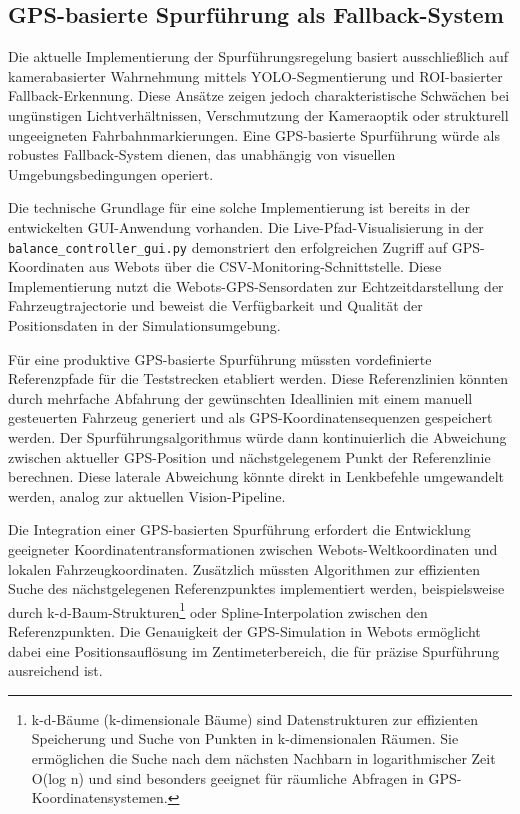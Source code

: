 \subsection{GPS-basierte Spurführung als Fallback-System}

Die aktuelle Implementierung der Spurführungsregelung basiert ausschließlich auf kamerabasierter Wahrnehmung mittels YOLO-Segmentierung 
und ROI-basierter Fallback-Erkennung. Diese Ansätze zeigen jedoch charakteristische Schwächen bei ungünstigen Lichtverhältnissen, 
Verschmutzung der Kameraoptik oder strukturell ungeeigneten Fahrbahnmarkierungen. Eine GPS-basierte Spurführung würde als 
robustes Fallback-System dienen, das unabhängig von visuellen Umgebungsbedingungen operiert.

Die technische Grundlage für eine solche Implementierung ist bereits in der entwickelten GUI-Anwendung vorhanden. Die 
Live-Pfad-Visualisierung in der \texttt{balance\_controller\_gui.py} demonstriert den erfolgreichen Zugriff auf GPS-Koordinaten 
aus Webots über die CSV-Monitoring-Schnittstelle. Diese Implementierung nutzt die Webots-GPS-Sensordaten zur Echtzeitdarstellung 
der Fahrzeugtrajectorie und beweist die Verfügbarkeit und Qualität der Positionsdaten in der Simulationsumgebung.

Für eine produktive GPS-basierte Spurführung müssten vordefinierte Referenzpfade für die Teststrecken etabliert werden. Diese 
Referenzlinien könnten durch mehrfache Abfahrung der gewünschten Ideallinien mit einem manuell gesteuerten Fahrzeug generiert 
und als GPS-Koordinatensequenzen gespeichert werden. Der Spurführungsalgorithmus würde dann kontinuierlich die Abweichung 
zwischen aktueller GPS-Position und nächstgelegenem Punkt der Referenzlinie berechnen. Diese laterale Abweichung könnte 
direkt in Lenkbefehle umgewandelt werden, analog zur aktuellen Vision-Pipeline.

Die Integration einer GPS-basierten Spurführung erfordert die Entwicklung geeigneter Koordinatentransformationen zwischen 
Webots-Weltkoordinaten und lokalen Fahrzeugkoordinaten. Zusätzlich müssten Algorithmen zur effizienten Suche des nächstgelegenen 
Referenzpunktes implementiert werden, beispielsweise durch k-d-Baum-Strukturen\footnote{k-d-Bäume (k-dimensionale Bäume) sind Datenstrukturen zur effizienten Speicherung und Suche von Punkten in k-dimensionalen Räumen. Sie ermöglichen die Suche nach dem nächsten Nachbarn in logarithmischer Zeit O(log n) und sind besonders geeignet für räumliche Abfragen in GPS-Koordinatensystemen.} oder Spline-Interpolation zwischen den 
Referenzpunkten. Die Genauigkeit der GPS-Simulation in Webots ermöglicht dabei eine Positionsauflösung im Zentimeterbereich, 
die für präzise Spurführung ausreichend ist.

